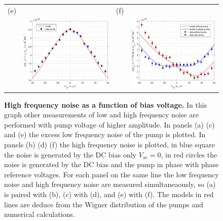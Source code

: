 \begin{figure}[hptb]
\begin{center}
\begin{tabular}{c c c c}
			(e) & & (f) & \\
			& \includegraphics[width = 6.5 cm]{./chap3/LF_noise_squeezed_181108_450mV} &
			& \includegraphics[width = 6.5 cm]{./chap3/RF_noise_squeezed_181108_450mV}
		\end{tabular}
	\end{center}
	
	\caption{\textbf{High frequency noise as a function of bias voltage.} In this graph other measurements of low and high frequency noise are performed with pump voltage of higher amplitude. In panels (a) (c) and (e) the excess low frequency noise of the pump is plotted. In panels (b) (d) (f) the high frequency noise is plotted, in blue square the noise is generated by the DC bias only $V_{\mathrm{ac}} = 0$, in red circles the noise is generated by the DC bias and the pump in phase with phase reference voltages. For each panel on the same line the low frequency noise and high frequency noise are measured simultaneaously, so (a) is paired with (b), (c) with (d), and (e) with (f). The models in red lines are deduce from the Wigner distribution of the pumps and numerical calculations. }
	\label{fig: additional squeezing}
\end{figure}

